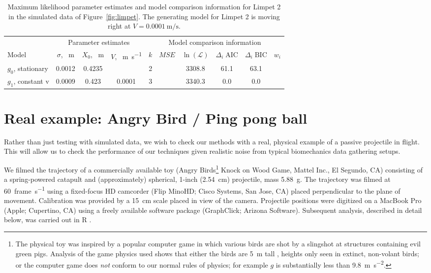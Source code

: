 \begin{table}
\caption{Maximum likelihood parameter estimates and model comparison information for Limpet 2 in the simulated data of Figure~\ref{fig:limpet}. The generating model for Limpet 2 is moving right at $V=\SI{0.0001}{\meter\per\second}$.} 
\label{tbl:limpet2}
\begin{tabular}{lccccccccc}
      & \multicolumn{3}{c}{Parameter estimates} & \multicolumn{6}{c}{Model comparison information} \\
Model & $\sigma$, \SI{}{\meter} & $X_0$, \SI{}{\meter} & $V$, \SI{}{\meter\per\second} & $k$ & $MSE$ & $\ln{(\mathcal{L})}$ & $\Delta_i\;\text{AIC}$ & $\Delta_i\;\text{BIC}$ & $w_i$ \\
\hline
$g_0$, stationary & \num{0.0012} & \num{0.4235} & \num{} & 2 & & \num{3308.8} & \num{61.1} & \num{63.1} & \\
\rowcolor[gray]{0.8} $g_1$, constant v & \num{0.0009} & \num{0.423} & \num{0.0001} & 3 & & \num{3340.3} & \num{0.0}& \num{0.0} & \\
\end{tabular}
\end{table}


\section{Real example:  Angry Bird / Ping pong ball}

Rather than just testing with simulated data, we wish to check our methods with a real, physical example of a passive projectile in flight.  This will allow us to check the performance of our techniques given realistic noise from typical biomechanics data gathering setups.  

We filmed the trajectory of a commercially available toy (Angry Birds\footnote{The physical toy was inspired by a popular computer game in which various birds are shot by a slingshot at structures containing evil green pigs.  Analysis of the game physics used shows that either the birds are \SI{5}{\meter} tall \cite{Allain:2010}, heights only seen in extinct, non-volant birds; or the computer game does \emph{not} conform to our normal rules of physics; for example $g$ is substantially less than \SI{9.8}{\meter\per\second\squared}.  } Knock on Wood Game, Mattel Inc., El Segundo, CA) consisting of a spring-powered catapult and (approximately) spherical, 1-inch (\SI{2.54}{\centi\meter}) projectile, mass \SI{5.88}{\gram}.  The trajectory was filmed at \SI{60}{frame\per\second} using a fixed-focus HD camcorder (Flip MinoHD; Cisco Systems, San Jose, CA) placed perpendicular to the plane of movement.  Calibration was provided by a \SI{15}{\centi\meter} scale placed in view of the camera.  Projectile positions were digitized on a MacBook Pro (Apple; Cupertino, CA) using a freely available software package (GraphClick; Arizona Software).  Subsequent analysis, described in detail below, was carried out in R \cite{R:2011}.    

